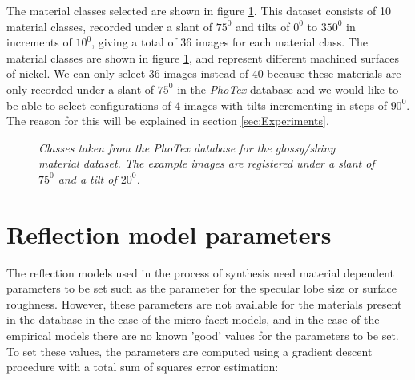 The material classes selected are shown in figure \ref{fig:PhoTexData2}. This dataset consists of 10 material classes, recorded under a slant of $75^0$ and tilts of $0^0$ to $350^0$ in increments of $10^0$, giving a total of 36 images for each material class. The material classes are shown in figure \ref{fig:PhoTexData2}, and represent different machined surfaces of nickel. We can only select 36 images instead of 40 because these materials are only recorded under a slant of $75^0$ in the {\it PhoTex} database and we would like to be able to select configurations of 4 images with tilts incrementing in steps of $90^0$. The reason for this will be explained in section \ref{sec:Experiments}.

\begin{figure}[h]
	\begin{center}

	\end{center}
	\caption{{\it Classes taken from the PhoTex database for the glossy/shiny material dataset. The example images are registered under a slant of $75^0$ and a tilt of $20^0$.}}
	\label{fig:PhoTexData2}
\end{figure}

\section{Reflection model parameters}\label{sec:ParameterSetting}
The reflection models used in the process of synthesis need material dependent parameters to be set such as the parameter for the specular lobe size or surface roughness. However, these parameters are not available for the materials present in the database in the case of the micro-facet models, and in the case of the empirical models there are no known 'good' values for the parameters to be set. To set these values, the parameters are computed using a gradient descent procedure with a total sum of squares error estimation:

